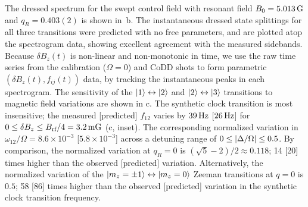 \documentclass[aps,prl,reprint,superscriptaddress,floatfix]{revtex4-1}
\begin{document}
The dressed spectrum for the swept control field with resonant field $B_0=\unit[5.013]{G}$ and $q_R=0.403(2)$ is shown in~b.
The instantaneous dressed state splittings for all three transitions were predicted with no free parameters, and are plotted atop the spectrogram data, showing excellent agreement with the measured sidebands.
Because $\delta B_z(t)$ is non-linear and non-monotonic in time, we use the raw time series from the calibration ($\Omega=0$) and CoDD shots to form parametric $(\delta B_z(t), f_{ij}(t))$ data, by tracking the instantaneous peaks in each spectrogram.
The sensitivity of the $\vert 1 \rangle  \leftrightarrow \vert 2 \rangle $ and $\vert 2 \rangle  \leftrightarrow \vert 3 \rangle $ transitions to magnetic field variations are shown in c.
The synthetic clock transition is most insensitive; the measured [predicted] $f_{12}$ varies by $\unit[39]{Hz}$ [$\unit[26]{Hz}$] for $0 \leq \delta B_z \leq B_{\text{rf}}/4 = \unit[3.2]{mG}$ (c, inset).
The corresponding normalized variation in $\omega_{12}/\Omega = 8.6\times10^{-3}$ [$5.8\times10^{-3}$] across a detuning range of $0 \leq \vert \Delta/\Omega \vert  \leq 0.5$.
By comparison, the normalized variation at $q_R=0$ is $(\sqrt{5}-2)/2 \approx 0.118$; 14 [20] times higher than the observed [predicted] variation.
Alternatively, the normalized variation of the $\vert m_z=\pm1 \rangle  \leftrightarrow \vert m_z = 0 \rangle $ Zeeman transitions at $q=0$ is $0.5$; 58 [86] times higher than the observed [predicted] variation in the synthetic clock transition frequency.
\end{document}
